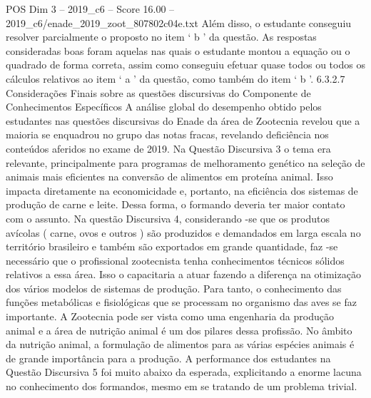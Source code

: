 \begin{textsample}{POS Dim 3 – 2019\_c6 – Score 16.00 – 2019\_c6/enade\_2019\_zoot\_807802c04e.txt}
Além disso, o estudante conseguiu resolver parcialmente o proposto no item ‘ b ’ da questão.
As respostas consideradas boas foram aquelas nas quais o estudante montou a equação ou o quadrado de forma correta, assim como conseguiu efetuar quase todos ou todos os cálculos relativos ao item ‘ a ’ da questão, como também do item ‘ b ’. 6.3.2.7 Considerações Finais sobre as questões discursivas do Componente de Conhecimentos Específicos A análise global do desempenho obtido pelos estudantes nas questões discursivas do Enade da área de Zootecnia revelou que a maioria se enquadrou no grupo das notas fracas, revelando deficiência nos conteúdos aferidos no exame de 2019.
Na Questão Discursiva 3 o tema era relevante, principalmente para programas de melhoramento genético na seleção de animais mais eficientes na conversão de alimentos em proteína animal.
Isso impacta diretamente na economicidade e, portanto, na eficiência dos sistemas de produção de carne e leite.
Dessa forma, o formando deveria ter maior contato com o assunto.
Na questão Discursiva 4, considerando -se que os produtos avícolas ( carne, ovos e outros ) são produzidos e demandados em larga escala no território brasileiro e também são exportados em grande quantidade, faz -se necessário que o profissional zootecnista tenha conhecimentos técnicos sólidos relativos a essa área.
Isso o capacitaria a atuar fazendo a diferença na otimização dos vários modelos de sistemas de produção.
Para tanto, o conhecimento das funções metabólicas e fisiológicas que se processam no organismo das aves se faz importante.
A Zootecnia pode ser vista como uma engenharia da produção animal e a área de nutrição animal é um dos pilares dessa profissão.
No âmbito da nutrição animal, a formulação de alimentos para as várias espécies animais é de grande importância para a produção.
A performance dos estudantes na Questão Discursiva 5 foi muito abaixo da esperada, explicitando a enorme lacuna no conhecimento dos formandos, mesmo em se tratando de um problema trivial.

\end{textsample}

